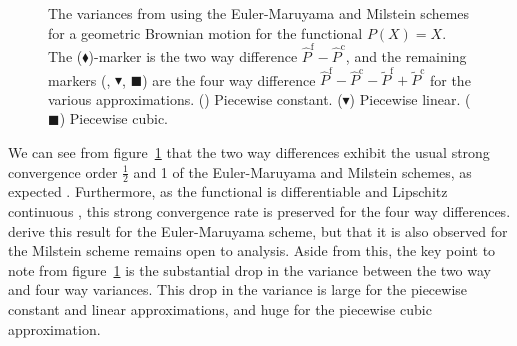 \documentclass[manuscript,review]{acmart}
\begin{document}
\begin{figure}[htb]
\centering

\hfill
{}\hfill 
{}\hfill

\caption{The variances from using the Euler-Maruyama and Milstein schemes for a geometric Brownian motion for the functional $ P(X) = X $. The ($ \blacklozenge $)-marker is the two way difference $ \hat{P}^{\mathrm{f}} - \hat{P}^{\mathrm{c}} $, and the remaining markers (\raisebox{-0.1em}{\huge$ \bullet$}, {\large $ \blacktriangledown $}, $ \blacksquare $) are the four way difference $ \hat{P}^{\mathrm{f}} - \hat{P}^{\mathrm{c}} - \tilde{P}^{\mathrm{f}} + \tilde{P}^{\mathrm{c}} $ for the various approximations. (\raisebox{-0.1em}{\huge$ \bullet$}) Piecewise constant. ({\large $ \blacktriangledown $}) Piecewise linear. ($ \blacksquare $) Piecewise cubic.}
\label{fig:variance_reduction}

\end{figure}

We can see from figure~\ref{fig:variance_reduction} that the two way differences exhibit the usual strong convergence order $ \tfrac{1}{2} $ and 1 of the Euler-Maruyama and Milstein schemes, as expected \citep{kloeden1999numerical}. Furthermore, as the functional is differentiable and Lipschitz continuous \citep{giles2020approximate,sheridan2020nested}, this strong convergence rate is preserved for the four way differences. \citeauthor{giles2020approximate} \citep{giles2020approximate,sheridan2020nested} derive this result for the Euler-Maruyama scheme, but that it is also observed for the Milstein scheme remains open to analysis. Aside from this, the key point to note from figure~\ref{fig:variance_reduction} is the substantial drop in the variance between the two way and four way variances. This drop in the variance is large for the piecewise constant and linear approximations, and huge for the piecewise cubic approximation. 
\end{document}

